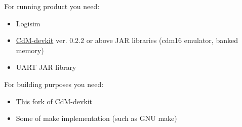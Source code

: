 For running product you need:

\begin{itemize}
	\item Logisim
	\item \href{https://github.com/cdm-processors/cdm-devkit}{CdM-devkit} ver. 0.2.2 or above JAR libraries (cdm16 emulator, banked memory)
	\item UART JAR library
\end{itemize}

For building purposes you need:

\begin{itemize}
	\item \href{https://github.com/Proletcultist/cdm-devkit-macro-improvements}{This} fork of CdM-devkit
	\item Some of make implementation (such as GNU make)
\end{itemize}
